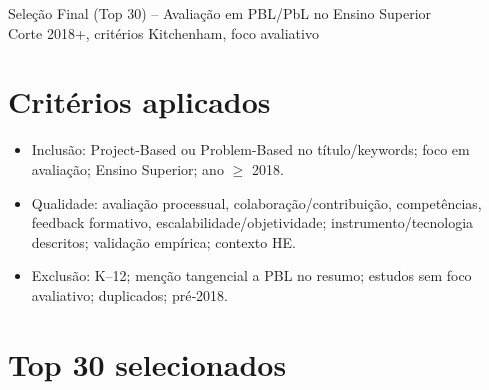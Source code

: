 \documentclass[11pt,a4paper]{article}
\begin{document}
\begin{center}
{\LARGE Seleção Final (Top 30) – Avaliação em PBL/PbL no Ensino Superior}\\[6pt]
{\large Corte 2018+, critérios Kitchenham, foco avaliativo}
\end{center}

\section*{Critérios aplicados}
\begin{itemize}
  \item Inclusão: Project-Based ou Problem-Based no título/keywords; foco em avaliação; Ensino Superior; ano $\ge$ 2018.
  \item Qualidade: avaliação processual, colaboração/contribuição, competências, feedback formativo, escalabilidade/objetividade; instrumento/tecnologia descritos; validação empírica; contexto HE.
  \item Exclusão: K–12; menção tangencial a PBL no resumo; estudos sem foco avaliativo; duplicados; pré‑2018.
\end{itemize}

\section*{Top 30 selecionados}
\end{document}

